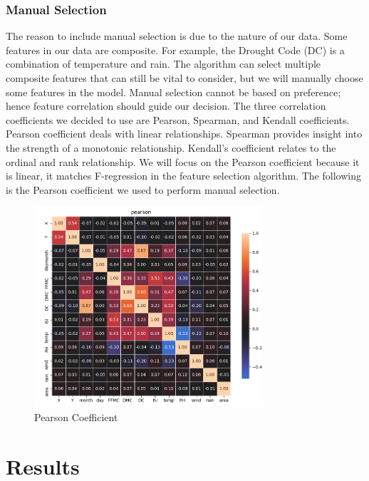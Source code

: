 \documentclass[conference]{IEEEtran}
\begin{document}
\subsubsection{Manual Selection}
The reason to include manual selection is due to the nature of our data. Some features in our data are composite. For example, the Drought Code (DC) is a combination of temperature and rain. The algorithm can select multiple composite features that can still be vital to consider, but we will manually choose some features in the model. Manual selection cannot be based on preference; hence feature correlation should guide our decision. The three correlation coefficients we decided to use are Pearson, Spearman, and Kendall coefficients. Pearson coefficient deals with linear relationships. Spearman provides insight into the strength of a monotonic relationship. Kendall's coefficient relates to the ordinal and rank relationship. We will focus on the Pearson coefficient because it is linear, it matches F-regression in the feature selection algorithm. The following is the Pearson coefficient we used to perform manual selection.
\begin{figure}[H]
    \centering
    \includegraphics[width=8.5cm]{pearson.png}
    \caption{Pearson Coefficient}
    \label{fig:pearson}
\end{figure}

\section{Results}
\end{document}
